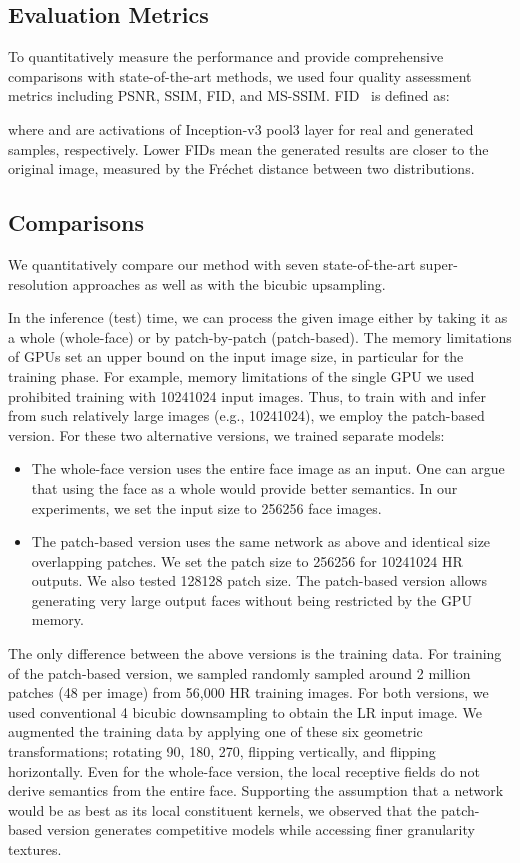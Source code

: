 \documentclass[10pt,twocolumn,letterpaper]{article}
\begin{document}
\subsection{Evaluation Metrics}\label{sec:metric}

To quantitatively measure the performance and provide comprehensive comparisons with state-of-the-art methods, we used four quality assessment metrics including PSNR, SSIM, FID, and MS-SSIM. FID~\cite{heusel2017gans} is defined as:

where  and  are activations of Inception-v3 pool3 layer for real and generated samples, respectively. Lower FIDs mean the generated results are closer to the original image, measured by the Fr\'echet distance between two distributions.

\subsection{Comparisons}

We quantitatively compare our method with seven state-of-the-art super-resolution approaches as well as with the bicubic upsampling. 

In the inference (test) time, we can process the given image either by taking it as a whole (whole-face) or by patch-by-patch (patch-based). The memory limitations of GPUs set an upper bound on the input image size, in particular for the training phase.  For example, memory limitations of the single GPU we used prohibited training with 10241024 input images. Thus, to train with and infer from such relatively large images (e.g., 10241024), we employ the patch-based version. For these two alternative versions, we trained separate models:
\begin{itemize}
\item The whole-face version uses the entire face image as an input. One can argue that using the face as a whole would provide better semantics. In our experiments, we set the input size to 256256 face images. 
\item The patch-based version uses the same network as above and identical size overlapping patches. We set the patch size to 256256 for 10241024 HR outputs. We also tested 128128 patch size. The patch-based version allows generating very large output faces without being restricted by the GPU memory.  
\end{itemize}
The only difference between the above versions is the training data. For training of the patch-based version, we sampled randomly sampled around 2 million patches (48 per image) from 56,000 HR training images. For both versions, we used conventional 4 bicubic downsampling to obtain the LR input image. We augmented the training data by applying one of these six geometric transformations; rotating 90, 180, 270, flipping vertically, and flipping horizontally. Even for the whole-face version, the local receptive fields do not derive semantics from the entire face. Supporting the assumption that a network would be as best as its local constituent kernels, we observed that the patch-based version generates competitive models while accessing finer granularity textures. 
\end{document}

